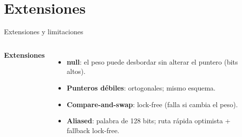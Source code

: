 \documentclass[aspectratio=169,11pt,xcolor=table]{beamer}
\begin{document}
\section{Extensiones}
\begin{frame}{Extensiones y limitaciones}
  \begin{columns}[T]
    \textbf{Extensiones}
    \begin{itemize}
      \item \textbf{null}: el peso puede desbordar sin alterar el puntero (bits altos).
      \item \textbf{Punteros débiles}: ortogonales; mismo esquema.
      \item \textbf{Compare-and-swap}: lock-free (falla si cambia el peso).
      \item \textbf{Aliased}: palabra de 128 bits; ruta rápida optimista + fallback lock-free.
    \end{itemize}
  \end{columns}
\end{frame}

\end{document}
